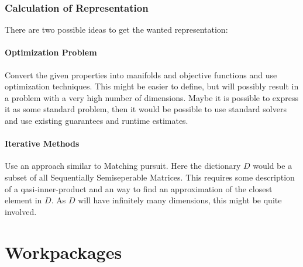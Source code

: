 \documentclass[lang=ngerman,inputenc=utf8,fontsize=10pt]{ldvarticle}
\begin{document}
\subsubsection*{Calculation of Representation}
There are two possible ideas to get the wanted representation:

\paragraph{Optimization Problem}
Convert the given properties into manifolds and objective functions and use optimization techniques.
This might be easier to define, but will possibly result in a problem with a very high number of dimensions. Maybe it is possible to express it as some standard problem, then it would be possible to use standard solvers and use existing guarantees and runtime estimates.

\paragraph{Iterative Methods}
Use an approach similar to Matching pursuit. Here the dictionary $D$ would be a subset of all Sequentially Semiseperable Matrices. This requires some description of a qasi-inner-product and an way to find an approximation of the closest element in $D$.
As $D$ will have infinitely many dimensions, this might be quite involved.



\section{Workpackages}
\end{document}
